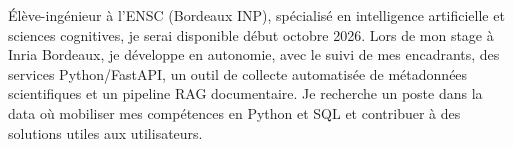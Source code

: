 
\begin{cvparagraph}
Élève-ingénieur à l’ENSC (Bordeaux INP), spécialisé en intelligence artificielle et sciences cognitives, je serai disponible début octobre 2026. Lors de mon stage à Inria Bordeaux, je développe en autonomie, avec le suivi de mes encadrants, des services Python/FastAPI, un outil de collecte automatisée de métadonnées scientifiques et un pipeline RAG documentaire. Je recherche un poste dans la data où mobiliser mes compétences en Python et SQL et contribuer à des solutions utiles aux utilisateurs.
\end{cvparagraph}
